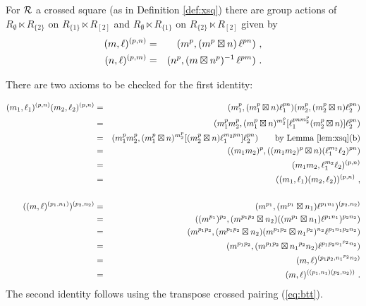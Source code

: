 \begin{prop} \label{prop:semidirect-actions}
For $\mathcal{R}$ a crossed square (as in Definition \ref{def:xsq}) 
there are group actions of   
$R_{\emptyset} \ltimes R_{\{2\}}$  on $R_{\{1\}} \ltimes R_{[2]}$
and  $R_{\emptyset} \ltimes R_{\{1\}}$  on $R_{\{2\}} \ltimes R_{[2]}$
given by
\begin{eqnarray}
(m,\ell)^{(p,n)} & = &  (m^p, (m^p \boxtimes n)\,\ell^{pn}) ~,  \label{eq:action1}\\
(n,\ell)^{(p,m)} & = &  (n^p, (m \boxtimes n^p)^{-1}\,\ell^{pm}) \label{eq:action2}
\label{eq:semidirect-action}~.
\end{eqnarray}
\end{prop}
\begin{pf}
There are two axioms to be checked for the first identity: 

\medskip
\begin{eqnarray*}
(m_1,\ell_1)^{(p,n)} (m_2,\ell_2)^{(p,n)}  
& = &  (m_1^p, (m_1^p \boxtimes n)\ell_1^{pn})(m_2^p, (m_2^p \boxtimes n)\ell_2^{pn}) \\
& = &  (m_1^pm_2^p, (m_1^p \boxtimes n)^{m_2^p} 
          [\ell_1^{pnm_2^p}(m_2^p \boxtimes n)] \ell_2^{pn}) \\
& = &  (m_1^pm_2^p, (m_1^p \boxtimes n)^{m_2^p} 
          [(m_2^p \boxtimes n) \ell_1^{m_2pn}] \ell_2^{pn}) 
       \qquad\mbox{by Lemma \ref{lem:xsq}(b)} \\
& = &  ((m_1m_2)^p, ((m_1m_2)^p \boxtimes n)(\ell_1^{m_2}\ell_2)^{pn}) \\
& = &  (m_1m_2, \ell_1^{m_2}\ell_2)^{(p,n)} \\
& = &  ((m_1,\ell_1)(m_2,\ell_2))^{(p,n)}~,  \\
&   &  \mbox{} \\
((m,\ell)^{(p_1,n_1)})^{(p_2,n_2)}
& = &  (m^{p_1}, (m^{p_1} \boxtimes n_1)\ell^{p_1n_1})^{(p_2,n_2)} \\
& = &  ((m^{p_1})^{p_2}, (m^{p_1p_2} \boxtimes n_2)
        ((m^{p_1} \boxtimes n_1)\ell^{p_1n_1})^{p_2n_2}) \\
& = &  (m^{p_1p_2}, (m^{p_1p_2} \boxtimes n_2)
        (m^{p_1p_2} \boxtimes {n_1}^{p_2})^{n_2} \ell^{p_1n_1p_2n_2}) \\
& = &  (m^{p_1p_2}, (m^{p_1p_2} \boxtimes {n_1}^{p_2}n_2) 
          \ell^{p_1p_2{n_1}^{p_2}n_2}) \\
& = &  (m,\ell)^{(p_1p_2,{n_1}^{p_2}n_2)} \\
& = &  (m,\ell)^{((p_1,n_1)(p_2,n_2))} ~.
\end{eqnarray*}
The second identity follows using the transpose crossed pairing (\ref{eq:btt}).
\end{pf}


